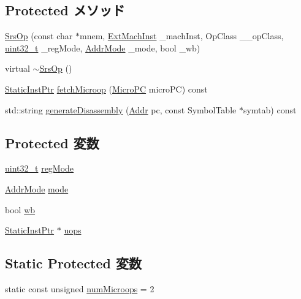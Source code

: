 \subsection*{Protected メソッド}
\begin{DoxyCompactItemize}
\item 
\hyperlink{classArmISA_1_1SrsOp_a9eafbc278cccd5d25089acb0d5c1d10d}{SrsOp} (const char $\ast$mnem, \hyperlink{classStaticInst_a5605d4fc727eae9e595325c90c0ec108}{ExtMachInst} \_\-machInst, OpClass \_\-\_\-opClass, \hyperlink{Type_8hh_a435d1572bf3f880d55459d9805097f62}{uint32\_\-t} \_\-regMode, \hyperlink{classArmISA_1_1SrsOp_abf132b4ad93f3557cd3956577592ba68}{AddrMode} \_\-mode, bool \_\-wb)
\item 
virtual \hyperlink{classArmISA_1_1SrsOp_a83ecc1fc97159d87d353b296539d1494}{$\sim$SrsOp} ()
\item 
\hyperlink{classRefCountingPtr}{StaticInstPtr} \hyperlink{classArmISA_1_1SrsOp_ae9e7acd6304ee397f1ab470e283ae76b}{fetchMicroop} (\hyperlink{base_2types_8hh_adfb4d8b20c5abc8be73dd367b16f2d57}{MicroPC} microPC) const 
\item 
std::string \hyperlink{classArmISA_1_1SrsOp_a3134956ec18bb095818e06eb988f6c55}{generateDisassembly} (\hyperlink{classm5_1_1params_1_1Addr}{Addr} pc, const SymbolTable $\ast$symtab) const 
\end{DoxyCompactItemize}
\subsection*{Protected 変数}
\begin{DoxyCompactItemize}
\item 
\hyperlink{Type_8hh_a435d1572bf3f880d55459d9805097f62}{uint32\_\-t} \hyperlink{classArmISA_1_1SrsOp_a12db2fba9f7d55fc14b04e70c215b68c}{regMode}
\item 
\hyperlink{classArmISA_1_1SrsOp_abf132b4ad93f3557cd3956577592ba68}{AddrMode} \hyperlink{classArmISA_1_1SrsOp_a273a5f1b71915654f056568ae963b5de}{mode}
\item 
bool \hyperlink{classArmISA_1_1SrsOp_a93541ed16711b2c9c53cf093b675d90b}{wb}
\item 
\hyperlink{classRefCountingPtr}{StaticInstPtr} $\ast$ \hyperlink{classArmISA_1_1SrsOp_a4b95b3465f3133312f95fdaf25b90b36}{uops}
\end{DoxyCompactItemize}
\subsection*{Static Protected 変数}
\begin{DoxyCompactItemize}
\item 
static const unsigned \hyperlink{classArmISA_1_1SrsOp_a0e01007cc580b30b13363bf037eb849f}{numMicroops} = 2
\end{DoxyCompactItemize}



